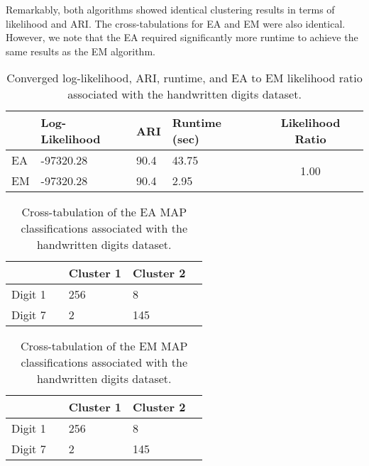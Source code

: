 \documentclass[12pt]{report}
\begin{document}
Remarkably, both algorithms showed identical clustering results in terms of likelihood and ARI. The cross-tabulations for EA and EM were also identical. However, we note that the EA required significantly more runtime to achieve the same results as the EM algorithm.



\begin{table}[!htbp]
  \caption{Converged log-likelihood, ARI, runtime, and EA to EM likelihood ratio associated with the handwritten digits dataset.}
    \vspace{0.5cm}
  \begin{tabularx}{\textwidth}{l *{3}{X}c}
  \toprule
    &\textbf{Log-Likelihood}& \textbf{ARI} & \textbf{Runtime (sec)} & \textbf{Likelihood Ratio} \\
  \midrule
  EA & -97320.28     & 90.4 &  43.75 & \multirow{2}{*}{1.00}  \\
  EM & -97320.28    & 90.4 & 2.95  \\
  \bottomrule
  \end{tabularx}
\end{table}


\begin{table}[!htbp]
  \caption{Cross-tabulation of the EA MAP classifications associated with the handwritten digits dataset.}
    \vspace{0.5cm}
  \begin{tabularx}{\textwidth}{l *{4}{X}}
  \toprule
   && \textbf{Cluster 1}  & \textbf{Cluster 2}  \\
  \midrule
  Digit 1 && 256 & 8 \\
  Digit 7 && 2 &  145 \\
  \bottomrule
  \end{tabularx}
\end{table}

\begin{table}[!ht]
  \caption{Cross-tabulation of the EM MAP classifications associated with the handwritten digits dataset.}
    \vspace{0.5cm}
  \begin{tabularx}{\textwidth}{l *{4}{X}}
  \toprule
   && \textbf{Cluster 1}  & \textbf{Cluster 2} \\
  \midrule
  Digit 1 && 256 & 8 \\
  Digit 7 && 2 &  145 \\
  \bottomrule
  \end{tabularx}
\end{table}
\end{document}
